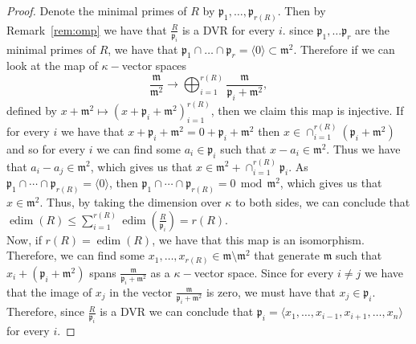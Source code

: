 \documentclass{article}
\DeclareMathOperator{\edim}{edim}
\numberwithin{theorem}{section}
\renewcommand{\mod}{\,\operatorname{mod}\,}
\begin{document}

\begin{proof}
    Denote the minimal primes of $R$ by $\mathfrak{p}_1, \dots, \mathfrak{p}_{r(R)}$. Then by Remark~\ref{rem:omp} we have that $\frac{R}{\mathfrak{p}_i}$ is a DVR for every $i$. since $\mathfrak{p}_1, \dots \mathfrak{p}_r$ are the minimal primes of $R$, we have that $\mathfrak{p}_1 \cap \dots \cap \mathfrak{p}_r = \langle 0 \rangle \subset \mathfrak{m}^2$. Therefore if we can look at the map of $\kappa-$vector spaces 
    \begin{equation*}
        \frac{{\mathfrak{m}}}{{\mathfrak{m}}^2} \to\bigoplus_{i=1}^{r(R)} \frac{\mathfrak{m}}{\mathfrak{p}_i + \mathfrak{m}^2}, 
    \end{equation*}
    \noindent defined by $x + \mathfrak{m}^2 \mapsto (x+ \mathfrak{p}_i + \mathfrak{m}^2)_{i=1}^{r(R)}$, then we claim this map is injective. If for every $i$ we have that $x+ \mathfrak{p}_i + \mathfrak{m}^2 = 0+ \mathfrak{p}_i + \mathfrak{m}^2$ then $x \in \cap_{i=1}^{r(R)} (\mathfrak{p}_i + \mathfrak{m}^2)$ and so for every $i$ we can find some $a_i \in \mathfrak{p}_i$ such that $x-a_i \in \mathfrak{m}^2$. Thus we have that $a_i-a_j \in \mathfrak{m}^2$, which gives us that $x \in \mathfrak{m}^2+ \cap_{i=1}^{r(R)} \mathfrak{p}_i$. As $\mathfrak{p}_1 \cap \cdots \cap \mathfrak{p}_{r(R)}=\langle 0 \rangle$, then $\mathfrak{p}_1 \cap \cdots \cap \mathfrak{p}_{r(R)} = 0 \mod \mathfrak{m}^2$, which gives us that $x \in \mathfrak{m}^2$. Thus, by taking the dimension over $\kappa$ to both sides, we can conclude that $\edim(R) \leq \sum_{i=1}^{r(R)} \edim \left( \frac{R}{\mathfrak{p}_i} \right) = r(R)$.\\
    
    Now, if $r(R)=\edim(R)$, we have that this map is an isomorphism. Therefore,  we can find some $x_1, \dots, x_{r(R)} \in \mathfrak{m} \setminus \mathfrak{m}^2$ that generate $\mathfrak{m}$ such that $x_i + (\mathfrak{p}_i +\mathfrak{m}^2)$ spans $\frac{\mathfrak{m}}{\mathfrak{p}_i + \mathfrak{m}^2}$ as a $\kappa-$vector space. Since for every $i \neq j$ we have that the image of $x_j$ in the vector $\frac{\mathfrak{m}}{\mathfrak{p}_i + \mathfrak{m}^2}$ is zero, we  must have that $x_j \in \mathfrak{p}_i$. Therefore, since $\frac{R}{\mathfrak{p}_i}$ is a DVR we can conclude that $\mathfrak{p}_i = \langle x_1, \dots, x_{i-1}, x_{i+1}, \dots, x_n\rangle$ for every $i$. 
\end{proof}
\end{document}
